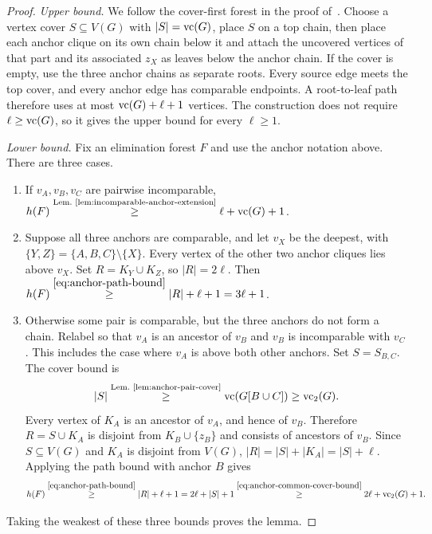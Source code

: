 \begin{proof}
\emph{Upper bound.}
We follow the cover-first forest in the proof of~\cite[Lemma~6]{BNS}.
Choose a vertex cover $S\subseteq V(G)$ with $|S|=\operatorname{vc}(G)$,
place $S$ on a top chain, then place each anchor clique
on its own chain below it and attach the uncovered vertices of
that part and its associated $z_X$ as leaves below the anchor chain.
If the cover is empty, use the three anchor chains as separate roots.
Every source edge meets the top cover, and every anchor edge has
comparable endpoints. A root-to-leaf path therefore uses at most
$\operatorname{vc}(G)+\ell+1$ vertices. The construction does not require
$\ell\ge\operatorname{vc}(G)$, so it gives the upper bound for every $\ell\ge1$.

\emph{Lower bound.}
Fix an elimination forest $F$ and use the anchor notation above.
There are three cases.
\begin{enumerate}
 \item If $v_A,v_B,v_C$ are pairwise incomparable,
   $h(F)\overset{\text{Lem.~\ref{lem:incomparable-anchor-extension}}}{\ge}
   \ell+\operatorname{vc}(G)+1$.

  \item Suppose all three anchors are comparable, and let $v_X$
    be the deepest, with $\{Y,Z\}=\{A,B,C\}\setminus\{X\}$.
    Every vertex of the other two anchor cliques lies above $v_X$.
    Set $R=K_Y\cup K_Z$, so $|R|=2\ell$.
    Then
    $h(F)\overset{\eqref{eq:anchor-path-bound}}{\geq}|R|+\ell+1=3\ell+1$.

 \item Otherwise some pair is comparable, but the three anchors do
   not form a chain. Relabel so that $v_A$ is an ancestor of
   $v_B$ and $v_B$ is incomparable with $v_C$.
   This includes the case where $v_A$ is above both other
   anchors. Set $S=S_{B,C}$. The cover bound is
   \begin{equation}\label{eq:anchor-common-cover-bound}
    |S|\overset{\text{Lem.~\ref{lem:anchor-pair-cover}}}{\ge}
    \operatorname{vc}(G[B\cup C])\ge\operatorname{vc}_2(G).
   \end{equation}
   Every vertex
   of $K_A$ is an ancestor of $v_A$, and hence of $v_B$.
   Therefore $R=S\cup K_A$ is disjoint from $K_B\cup\{z_B\}$ and
    consists of ancestors of $v_B$. Since $S\subseteq V(G)$ and
    $K_A$ is disjoint from $V(G)$, $|R|=|S|+|K_A|=|S|+\ell$.
    Applying the path bound with anchor $B$ gives
    \[
    h(F)\overset{\eqref{eq:anchor-path-bound}}{\geq}|R|+\ell+1
           =2\ell+|S|+1
  \overset{\eqref{eq:anchor-common-cover-bound}}{\geq}
           2\ell+\operatorname{vc}_2(G)+1.
    \]
\end{enumerate}
Taking the weakest of these three bounds proves the lemma.
\end{proof}

